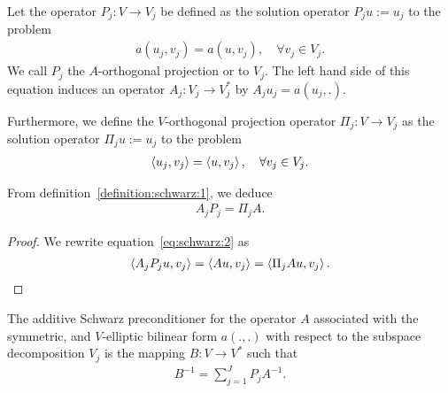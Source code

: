 \begin{definition}
  \label{definition:schwarz:1}
  Let the operator $P_j: V \to V_j$ be defined as the solution
  operator $P_j u := u_j$ to the problem
  \begin{gather}
    \label{eq:schwarz:2}
    a(u_j,v_j) = a(u,v_j),\quad\forall v_j\in V_j.
  \end{gather}
  We call $P_j$ the $A$-orthogonal projection or  to
  $V_j$. The left hand side of this equation induces an operator $A_j:
  V_j \to V_j^*$ by $A_j u_j = a(u_j,.)$.

 Furthermore, we define the $V$-orthogonal projection operator
  $\Pi_j: V \to V_j$ as the solution operator $\Pi_j u := u_j$ to the problem
  \begin{gather}
    \label{eq:schwarz:3}
    \scal(u_j,v_j) = \scal(u,v_j),\quad\forall v_j\in V_j.
  \end{gather}
\end{definition}

\begin{lemma}
  \label{lemma:schwarz:2}  
  From definition~\ref{definition:schwarz:1}, we deduce
  \begin{gather}
    \label{eq:schwarz:15}
    A_j P_j = \Pi_j A.
  \end{gather}
\end{lemma}

\begin{proof}
  We rewrite equation~\eqref{eq:schwarz:2} as
  \begin{gather}
    \scal(A_j P_j u, v_j) = \scal(A u, v_j) = \scal(\Pi_j A u, v_j).
  \end{gather}
\end{proof}

\begin{definition}
  The additive Schwarz preconditioner for the operator $A$ associated
  with the symmetric, and $V$-elliptic bilinear form $a(.,.)$ with
  respect to the subspace decomposition $V_j$ is the mapping $B:
  V \to V^*$ such that
  \begin{gather}
    \label{eq:schwarz:4}
    B^{-1} = \sum_{j=1}^J P_j A^{-1}.
  \end{gather}
\end{definition}

